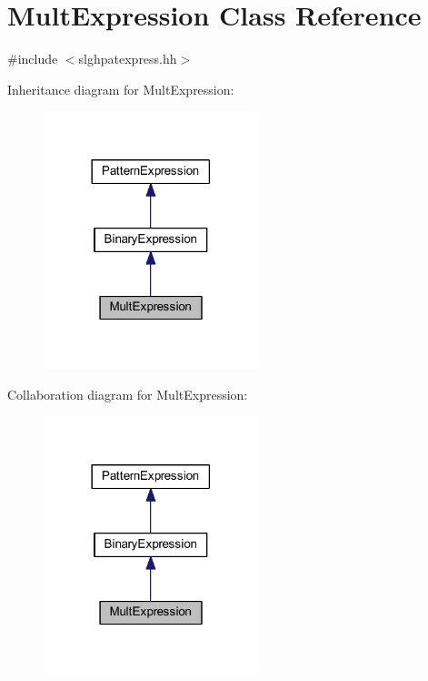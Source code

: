 \hypertarget{class_mult_expression}{}\section{Mult\+Expression Class Reference}
\label{class_mult_expression}


{\ttfamily \#include $<$slghpatexpress.\+hh$>$}



Inheritance diagram for Mult\+Expression\+:
\nopagebreak
\begin{figure}[H]
\begin{center}
\leavevmode
\includegraphics[width=177pt]{class_mult_expression__inherit__graph}
\end{center}
\end{figure}


Collaboration diagram for Mult\+Expression\+:
\nopagebreak
\begin{figure}[H]
\begin{center}
\leavevmode
\includegraphics[width=177pt]{class_mult_expression__coll__graph}
\end{center}
\end{figure}
